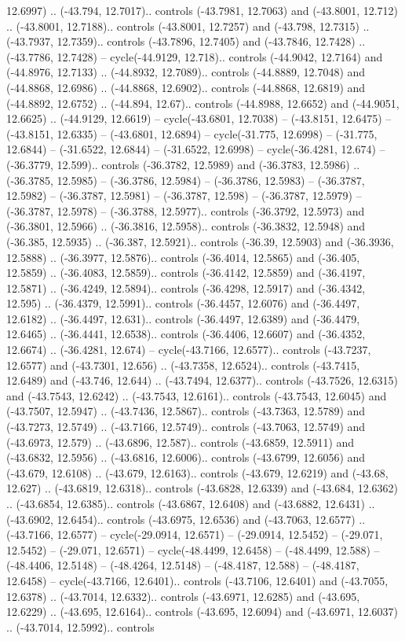 \begin{scope}[shift={(2.5552, 9.9912)}]
\begin{scope}[shift={(48.1654, -14.8546)}]
12.6997) .. (-43.794, 12.7017).. controls (-43.7981, 12.7063) and (-43.8001, 12.712) .. (-43.8001, 12.7188).. controls (-43.8001, 12.7257) and (-43.798, 12.7315) .. (-43.7937, 12.7359).. controls (-43.7896, 12.7405) and (-43.7846, 12.7428) .. (-43.7786, 12.7428) -- cycle(-44.9129, 12.718).. controls (-44.9042, 12.7164) and (-44.8976, 12.7133) .. (-44.8932, 12.7089).. controls (-44.8889, 12.7048) and (-44.8868, 12.6986) .. (-44.8868, 12.6902).. controls (-44.8868, 12.6819) and (-44.8892, 12.6752) .. (-44.894, 12.67).. controls (-44.8988, 12.6652) and (-44.9051, 12.6625) .. (-44.9129, 12.6619) -- cycle(-43.6801, 12.7038) -- (-43.8151, 12.6475) -- (-43.8151, 12.6335) -- (-43.6801, 12.6894) -- cycle(-31.775, 12.6998) -- (-31.775, 12.6844) -- (-31.6522, 12.6844) -- (-31.6522, 12.6998) -- cycle(-36.4281, 12.674) -- (-36.3779, 12.599).. controls (-36.3782, 12.5989) and (-36.3783, 12.5986) .. (-36.3785, 12.5985) -- (-36.3786, 12.5984) -- (-36.3786, 12.5983) -- (-36.3787, 12.5982) -- (-36.3787, 12.5981) -- (-36.3787, 12.598) -- (-36.3787, 12.5979) -- (-36.3787, 12.5978) -- (-36.3788, 12.5977).. controls (-36.3792, 12.5973) and (-36.3801, 12.5966) .. (-36.3816, 12.5958).. controls (-36.3832, 12.5948) and (-36.385, 12.5935) .. (-36.387, 12.5921).. controls (-36.39, 12.5903) and (-36.3936, 12.5888) .. (-36.3977, 12.5876).. controls (-36.4014, 12.5865) and (-36.405, 12.5859) .. (-36.4083, 12.5859).. controls (-36.4142, 12.5859) and (-36.4197, 12.5871) .. (-36.4249, 12.5894).. controls (-36.4298, 12.5917) and (-36.4342, 12.595) .. (-36.4379, 12.5991).. controls (-36.4457, 12.6076) and (-36.4497, 12.6182) .. (-36.4497, 12.631).. controls (-36.4497, 12.6389) and (-36.4479, 12.6465) .. (-36.4441, 12.6538).. controls (-36.4406, 12.6607) and (-36.4352, 12.6674) .. (-36.4281, 12.674) -- cycle(-43.7166, 12.6577).. controls (-43.7237, 12.6577) and (-43.7301, 12.656) .. (-43.7358, 12.6524).. controls (-43.7415, 12.6489) and (-43.746, 12.644) .. (-43.7494, 12.6377).. controls (-43.7526, 12.6315) and (-43.7543, 12.6242) .. (-43.7543, 12.6161).. controls (-43.7543, 12.6045) and (-43.7507, 12.5947) .. (-43.7436, 12.5867).. controls (-43.7363, 12.5789) and (-43.7273, 12.5749) .. (-43.7166, 12.5749).. controls (-43.7063, 12.5749) and (-43.6973, 12.579) .. (-43.6896, 12.587).. controls (-43.6859, 12.5911) and (-43.6832, 12.5956) .. (-43.6816, 12.6006).. controls (-43.6799, 12.6056) and (-43.679, 12.6108) .. (-43.679, 12.6163).. controls (-43.679, 12.6219) and (-43.68, 12.627) .. (-43.6819, 12.6318).. controls (-43.6828, 12.6339) and (-43.684, 12.6362) .. (-43.6854, 12.6385).. controls (-43.6867, 12.6408) and (-43.6882, 12.6431) .. (-43.6902, 12.6454).. controls (-43.6975, 12.6536) and (-43.7063, 12.6577) .. (-43.7166, 12.6577) -- cycle(-29.0914, 12.6571) -- (-29.0914, 12.5452) -- (-29.071, 12.5452) -- (-29.071, 12.6571) -- cycle(-48.4499, 12.6458) -- (-48.4499, 12.588) -- (-48.4406, 12.5148) -- (-48.4264, 12.5148) -- (-48.4187, 12.588) -- (-48.4187, 12.6458) -- cycle(-43.7166, 12.6401).. controls (-43.7106, 12.6401) and (-43.7055, 12.6378) .. (-43.7014, 12.6332).. controls (-43.6971, 12.6285) and (-43.695, 12.6229) .. (-43.695, 12.6164).. controls (-43.695, 12.6094) and (-43.6971, 12.6037) .. (-43.7014, 12.5992).. controls 
\end{scope}
\end{scope}
